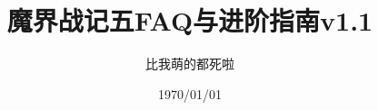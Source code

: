 


\title{魔界战记五FAQ与进阶指南v1.1}
\author{比我萌的都死啦}
\date{1970/01/01}

\maketitle


\newpage
\tableofcontents


% 









	








% 



